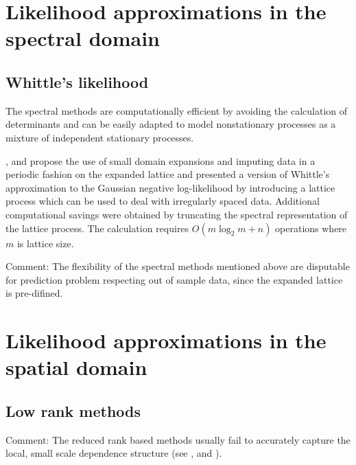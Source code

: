 \documentclass[
12pt, %
a4paper, %
oneside, %
headinclude,footinclude, %
BCOR5mm, %
]{scrartcl}
\begin{document}
\section{Likelihood approximations in the spectral domain}
\subsection{Whittle’s likelihood}

The spectral methods are computationally efficient by avoiding the calculation of determinants and can be easily adapted to model nonstationary processes as a mixture of independent stationary processes.

\href{https://chenyw68.github.io/Literature/[2007]Approximate Likelihood for Large Irregularly Spaced Spatial Data.pdf}{\cite{fuentes2007approximate}}, \href{https://chenyw68.github.io/Literature/[2020]Spectral Density Estimation for Random Fields via Periodic Embeddings.pdf}{\citep{guinness2019spectral}} and \href{https://chenyw68.github.io/Literature/[2017]Circulant Embedding of Approximate Covariances for Inference From Gaussian Data.pdf}{\citep{guinness2017circulant}} propose the use of small domain expansions and imputing data in a periodic fashion on the expanded lattice and  presented a version of Whittle’s approximation to the Gaussian negative log-likelihood by introducing a lattice process which can be used to deal with irregularly spaced data. Additional computational savings were obtained by truncating the spectral representation of the lattice process. The calculation requires $O(m \log_2 m + n)$ operations where $m$ is lattice size.

\textcolor[rgb]{1.00,0.00,1.00}{Comment:}
The flexibility of the spectral methods mentioned above are disputable for prediction problem respecting out of sample data, since the expanded lattice is pre-difined.

\section{Likelihood approximations in the spatial domain}
\subsection{Low rank methods}
\textcolor[rgb]{1.00,0.00,1.00}{Comment:}
The reduced rank based methods usually fail to accurately capture the local, small scale dependence structure (see \href{https://chenyw68.github.io/Literature/[2012]A full scale approximation of covariance functions for large spatial data sets.pdf}{\citep{sang2012full}}, \href{https://chenyw68.github.io/Literature/[2008]A modeling approach for large spatial datasets.pdf}{\citep{stein2008modeling}} and \href{https://chenyw68.github.io/Literature/[2009]Improving the performance of predictive process modeling for large datasets.pdf}{\citep{finley2009improving}}).
\end{document}
